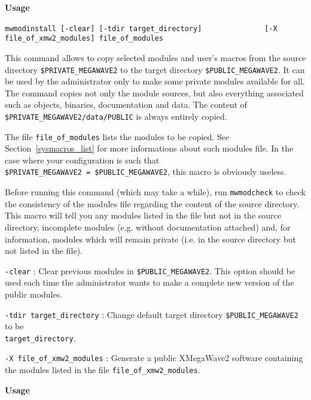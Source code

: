 {\Large\bf Usage} \bigskip

\verb+mwmodinstall [-clear] [-tdir target_directory]+
\newline
\verb+              [-X file_of_xmw2_modules] file_of_modules+

\Next

\Description
This command allows to copy selected modules and user's macros from the source directory 
\verb+$PRIVATE_MEGAWAVE2+ to the target directory \verb+$PUBLIC_MEGAWAVE2+.
It can be used by the administrator only to make some private modules available for all.
The command copies not only the module sources, but also everything associated such as
objects, binaries, documentation and data. 
The content of \verb+$PRIVATE_MEGAWAVE2/data/PUBLIC+ is always entirely copied.

The file \verb+file_of_modules+ lists the modules to be copied. See 
Section~\ref{sysmacros_list} for more informations about such modules file.
In the case where your configuration is such that \\
\verb+$PRIVATE_MEGAWAVE2 = $PUBLIC_MEGAWAVE2+, this macro is obviously useless.

Before running this command (which may take a while), run \verb+mwmodcheck+ to check
the consistency of the modules file regarding the content of the source directory.
This macro will tell you any modules listed in the file but not in the source directory,
incomplete modules (e.g. without documentation attached) and, for information, modules 
which will remain private (i.e. in the source directory but not listed in the file).
\Next

\Options

\verb+-clear+ :  Clear previous modules in \verb+$PUBLIC_MEGAWAVE2+. This option should
be used each time the administrator wants to make a complete new version of the
public modules. 

\verb+-tdir target_directory+ : Change default target directory \verb+$PUBLIC_MEGAWAVE2+ to be \\
\verb+target_directory+.

\verb+-X file_of_xmw2_modules+ : Generate a public XMegaWave2 software containing the 
modules listed in the file \verb+file_of_xmw2_modules+.


\newpage

{\Large\bf Usage} \bigskip

